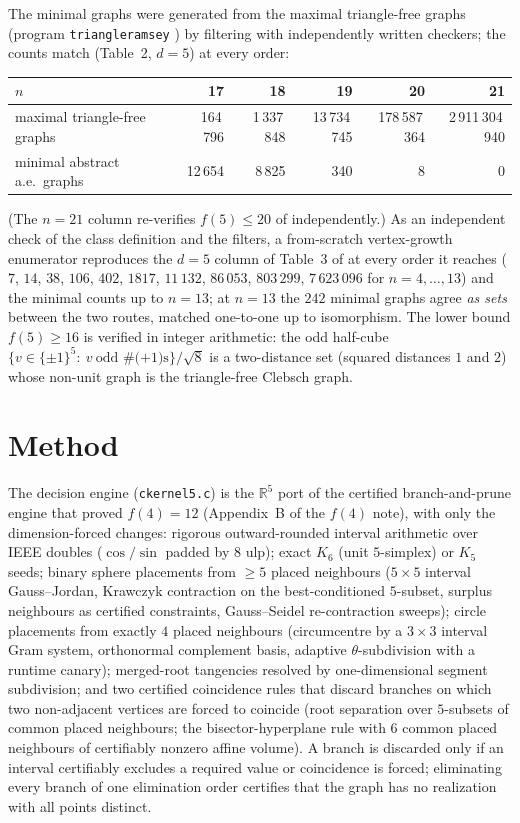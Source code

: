 \documentclass[11pt]{article}
\newcommand{\R}{\mathbb{R}}
\begin{document}
The minimal graphs were generated from the maximal triangle-free graphs
(program \texttt{triangleramsey} \cite{BGS,BBH}) by filtering with
independently written checkers; the counts match \cite{BPSSV} (Table~2,
$d=5$) at every order:

\begin{center}
\begin{tabular}{lrrrrr}
\toprule
$n$ & 17 & 18 & 19 & 20 & 21\\
\midrule
maximal triangle-free graphs & 164\,796 & 1\,337\,848 & 13\,734\,745 &
178\,587\,364 & 2\,911\,304\,940\\
minimal abstract a.e.\ graphs & 12\,654 & 8\,825 & 340 & 8 & 0\\
\bottomrule
\end{tabular}
\end{center}

(The $n=21$ column re-verifies $f(5)\le20$ of \cite{BPSSV} independently.)
As an independent check of the class definition and the filters, a
from-scratch vertex-growth enumerator reproduces the $d=5$ column of
Table~3 of \cite{BPSSV} at every order it reaches ($7$, $14$, $38$, $106$,
$402$, $1817$, $11\,132$, $86\,053$, $803\,299$, $7\,623\,096$ for
$n=4,\dots,13$) and the minimal counts up to $n=13$; at $n=13$ the $242$
minimal graphs agree \emph{as sets} between the two routes, matched
one-to-one up to isomorphism. The lower bound $f(5)\ge16$ is verified in
integer arithmetic: the odd half-cube
$\{v\in\{\pm1\}^5:\ v\ \text{odd \#(+1)s}\}/\sqrt8$ is a two-distance set
(squared distances $1$ and $2$) whose non-unit graph is the triangle-free
Clebsch graph.

\section*{Method}

The decision engine (\texttt{ckernel5.c}) is the $\R^5$ port of the
certified branch-and-prune engine that proved $f(4)=12$ (Appendix~B of
the $f(4)$ note), with only the dimension-forced changes: rigorous
outward-rounded interval arithmetic over IEEE doubles ($\cos/\sin$ padded
by $8$ ulp); exact $K_6$ (unit $5$-simplex) or $K_5$ seeds; binary
sphere placements from $\ge5$ placed neighbours ($5{\times}5$ interval
Gauss--Jordan, Krawczyk contraction on the best-conditioned $5$-subset,
surplus neighbours as certified constraints, Gauss--Seidel re-contraction
sweeps); circle placements from exactly $4$ placed neighbours
(circumcentre by a $3{\times}3$ interval Gram system, orthonormal
complement basis, adaptive $\theta$-subdivision with a runtime canary);
merged-root tangencies resolved by one-dimensional segment subdivision;
and two certified coincidence rules that discard branches on which two
non-adjacent vertices are forced to coincide (root separation over
$5$-subsets of common placed neighbours; the bisector-hyperplane rule
with $6$ common placed neighbours of certifiably nonzero affine volume).
A branch is discarded only if an interval certifiably excludes a required
value or coincidence is forced; eliminating every branch of one
elimination order certifies that the graph has no realization with all
points distinct.
\end{document}
